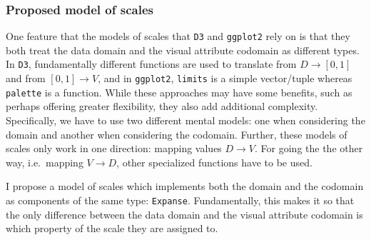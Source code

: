 \documentclass[
]{book}
\newenvironment{Shaded}{\begin{snugshade}}{\end{snugshade}}
\newcommand{\AttributeTok}[1]{\textcolor[rgb]{0.13,0.29,0.53}{#1}}
\newcommand{\CommentTok}[1]{\textcolor[rgb]{0.56,0.35,0.01}{\textit{#1}}}
\newcommand{\ControlFlowTok}[1]{\textcolor[rgb]{0.13,0.29,0.53}{\textbf{#1}}}
\newcommand{\FunctionTok}[1]{\textcolor[rgb]{0.13,0.29,0.53}{\textbf{#1}}}
\newcommand{\NormalTok}[1]{#1}
\newcommand{\OtherTok}[1]{\textcolor[rgb]{0.56,0.35,0.01}{#1}}
\newcommand{\SpecialCharTok}[1]{\textcolor[rgb]{0.81,0.36,0.00}{\textbf{#1}}}
\theoremstyle{definition}
\theoremstyle{definition}
\theoremstyle{definition}
\theoremstyle{definition}
\theoremstyle{remark}
\begin{document}
\begin{Shaded}
\end{Shaded}

\subsubsection{Proposed model of scales}\label{proposed-model-of-scales}

One feature that the models of scales that \texttt{D3} and \texttt{ggplot2} rely on is that they both treat the data domain and the visual attribute codomain as different types. In \texttt{D3}, fundamentally different functions are used to translate from \(D \to [0, 1]\) and from \([0, 1] \to V\), and in \texttt{ggplot2}, \texttt{limits} is a simple vector/tuple whereas \texttt{palette} is a function. While these approaches may have some benefits, such as perhaps offering greater flexibility, they also add additional complexity. Specifically, we have to use two different mental models: one when considering the domain and another when considering the codomain. Further, these models of scales only work in one direction: mapping values \(D \to V\). For going the the other way, i.e.~mapping \(V \to D\), other specialized functions have to be used.

I propose a model of scales which implements both the domain and the codomain as components of the same type: \texttt{Expanse}. Fundamentally, this makes it so that the only difference between the data domain and the visual attribute codomain is which property of the scale they are assigned to.
\end{document}
